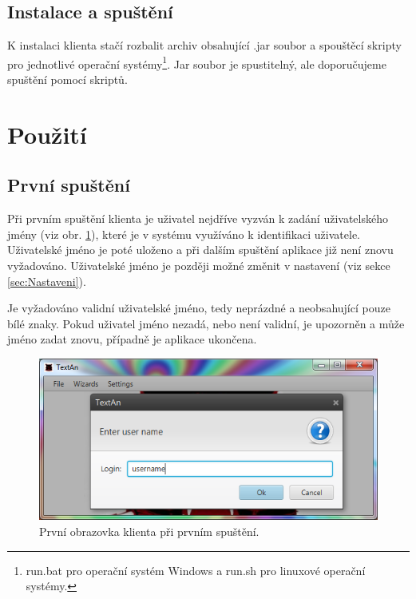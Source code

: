 \documentclass[12pt,a4paper]{report}
\begin{document}
\subsection{Instalace a spuštění}
K instalaci klienta stačí rozbalit archiv obsahující .jar soubor a spouštěcí skripty pro jednotlivé operační systémy\footnote{run.bat pro operační systém Windows a run.sh pro linuxové operační systémy.}. Jar soubor je spustitelný, ale doporučujeme spuštění pomocí skriptů.


\section{Použití}

\subsection{První spuštění}
Při prvním spuštění klienta je uživatel nejdříve vyzván k zadání uživatelského jmény (viz obr. \ref{fig:First}), které je v systému využíváno k identifikaci uživatele. Uživatelské jméno je poté uloženo a při dalším spuštění aplikace již není znovu vyžadováno. Uživatelské jméno je později možné změnit v nastavení (viz sekce \ref{sec:Nastaveni}).

Je vyžadováno validní uživatelské jméno, tedy neprázdné a neobsahující pouze bílé znaky. Pokud uživatel jméno nezadá, nebo není validní, je upozorněn a může jméno zadat znovu, případně je aplikace ukončena.

\begin{figure}[!htb]
	\centering
	\includegraphics[width=\textwidth]{first}
	\caption{První obrazovka klienta při prvním spuštění.}
	\label{fig:First}
\end{figure}
\end{document}
